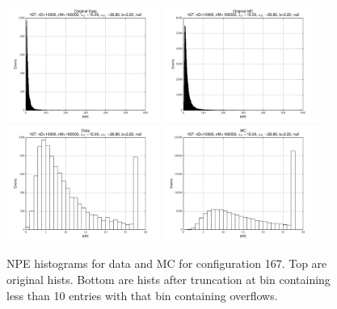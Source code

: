  \begin{figure}[htbp] \begin{center} 
\includegraphics[width=0.45\textwidth]{../FIGURES/167/FIG_Original_Data.pdf} 
\includegraphics[width=0.45\textwidth]{../FIGURES/167/FIG_Original_MC.pdf} 
\includegraphics[width=0.45\textwidth]{../FIGURES/167/FIG_Data.pdf} 
\includegraphics[width=0.45\textwidth]{../FIGURES/167/FIG_MC.pdf} 
\caption{NPE histograms for data and MC for configuration 167. Top are original hists. Bottom are hists after truncation at bin containing less than 10 entries with that bin containing overflows.} 
\label{tab:npe_167} 
\end{center} \end{figure} 
\clearpage
 